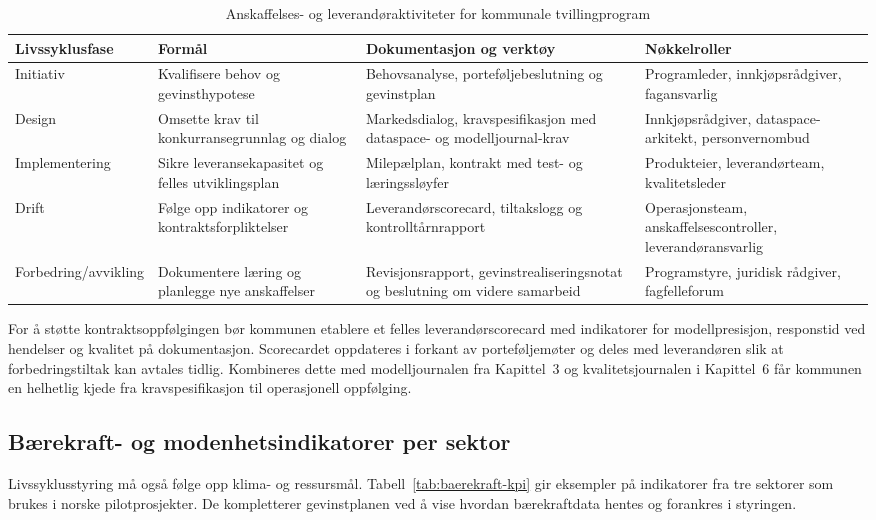 \begin{table}[h]
    \centering
    \caption{Anskaffelses- og leverandøraktiviteter for kommunale tvillingprogram}
    \label{tab:anskaffelse-livssyklus}
    \begin{tabular}{p{2.7cm}p{3.6cm}p{3.6cm}p{3.2cm}}
        \toprule
        Livssyklusfase & Formål & Dokumentasjon og verktøy & Nøkkelroller \\
        \midrule
        Initiativ & Kvalifisere behov og gevinsthypotese & Behovsanalyse, porteføljebeslutning og gevinstplan & Programleder, innkjøpsrådgiver, fagansvarlig \\
        Design & Omsette krav til konkurransegrunnlag og dialog & Markedsdialog, kravspesifikasjon med dataspace- og modelljournal-krav \citep{dfo2023anskaffelser,digdir2023modelljournal} & Innkjøpsrådgiver, dataspace-arkitekt, personvernombud \\
        Implementering & Sikre leveransekapasitet og felles utviklingsplan & Milepælplan, kontrakt med test- og læringssløyfer \citep{dfo2024anskaffelseki} & Produkteier, leverandørteam, kvalitetsleder \\
        Drift & Følge opp indikatorer og kontraktsforpliktelser & Leverandørscorecard, tiltakslogg og kontrolltårnrapport \citep{ks2023leverandor} & Operasjonsteam, anskaffelsescontroller, leverandøransvarlig \\
        Forbedring/avvikling & Dokumentere læring og planlegge nye anskaffelser & Revisjonsrapport, gevinstrealiseringsnotat og beslutning om videre samarbeid & Programstyre, juridisk rådgiver, fagfelleforum \\
        \bottomrule
    \end{tabular}
\end{table}

For å støtte kontraktsoppfølgingen bør kommunen etablere et felles leverandørscorecard med indikatorer for modellpresisjon, responstid ved hendelser og kvalitet på dokumentasjon. Scorecardet oppdateres i forkant av porteføljemøter og deles med leverandøren slik at forbedringstiltak kan avtales tidlig.\citep{ks2023leverandor} Kombineres dette med modelljournalen fra Kapittel~3 og kvalitetsjournalen i Kapittel~6 får kommunen en helhetlig kjede fra kravspesifikasjon til operasjonell oppfølging.

\subsection*{Bærekraft- og modenhetsindikatorer per sektor}
Livssyklusstyring må også følge opp klima- og ressursmål. Tabell~\ref{tab:baerekraft-kpi} gir eksempler på indikatorer fra tre sektorer som brukes i norske pilotprosjekter. De kompletterer gevinstplanen ved å vise hvordan bærekraftdata hentes og forankres i styringen.

